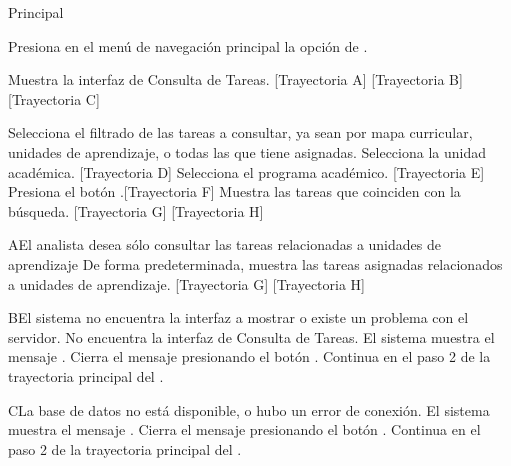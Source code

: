 \begin{UCtrayectoria}{Principal}
    
    \UCpaso[\UCactor] Presiona en el menú de navegación principal la opción de .
    
    \UCpaso Muestra la interfaz de Consulta de Tareas. [Trayectoria A] [Trayectoria B] [Trayectoria C]

    \UCpaso[\UCactor] Selecciona el filtrado de las tareas a consultar, ya sean por mapa curricular, unidades de aprendizaje, o todas las que tiene asignadas.
    \UCpaso[\UCactor] Selecciona la unidad académica. [Trayectoria D]
    \UCpaso[\UCactor] Selecciona el programa académico. [Trayectoria E]
    \UCpaso[\UCactor] Presiona el botón .[Trayectoria F]
    \UCpaso Muestra las tareas que coinciden con la búsqueda. [Trayectoria G] [Trayectoria H] 
    
    
\end{UCtrayectoria}


\begin{UCtrayectoriaA}{A}{El analista desea sólo consultar las tareas relacionadas a unidades de aprendizaje}
	\UCpaso De forma predeterminada, muestra las tareas asignadas relacionados a unidades de aprendizaje. [Trayectoria G] [Trayectoria H] 
\end{UCtrayectoriaA}


\begin{UCtrayectoriaA}{B}{El sistema no encuentra la interfaz a mostrar o existe un problema con el servidor.}
	\UCpaso No encuentra la interfaz de Consulta de Tareas.
    \UCpaso El sistema muestra el mensaje .
    \UCpaso[\UCactor] Cierra el mensaje presionando el botón .
    \UCpaso Continua en el paso 2 de la trayectoria principal del .
\end{UCtrayectoriaA}


\begin{UCtrayectoriaA}{C}{La base de datos no está disponible, o hubo un error de conexión.}
    \UCpaso El sistema muestra el mensaje .
    \UCpaso[\UCactor] Cierra el mensaje presionando el botón .
    \UCpaso Continua en el paso 2 de la trayectoria principal del .
\end{UCtrayectoriaA}


